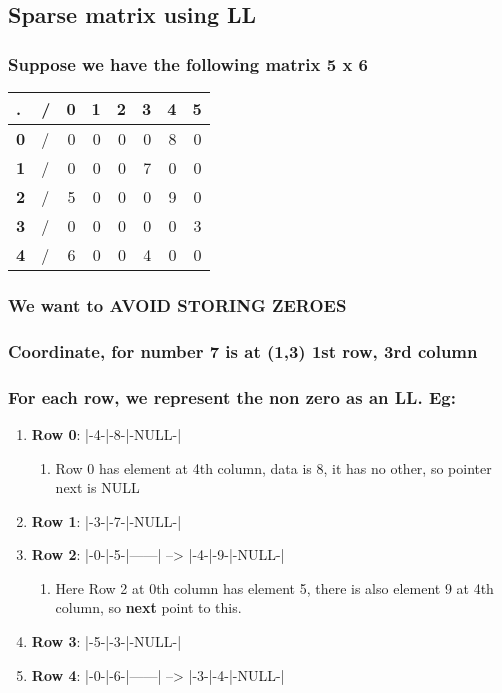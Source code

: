 \documentclass[11pt]{article}
\begin{document}
\subsection{Sparse matrix using LL}
\label{sec:org076b9bd}
\subsubsection{Suppose we have the following matrix 5 x 6}
\label{sec:org19e9da1}

\begin{center}
\begin{tabular}{llrrrrrr}
. & / & \textbf{0} & \textbf{1} & \textbf{2} & \textbf{3} & \textbf{4} & \textbf{5}\\
\hline
\textbf{0} & / & 0 & 0 & 0 & 0 & 8 & 0\\
\textbf{1} & / & 0 & 0 & 0 & 7 & 0 & 0\\
\textbf{2} & / & 5 & 0 & 0 & 0 & 9 & 0\\
\textbf{3} & / & 0 & 0 & 0 & 0 & 0 & 3\\
\textbf{4} & / & 6 & 0 & 0 & 4 & 0 & 0\\
\end{tabular}
\end{center}

\subsubsection{We want to \textbf{AVOID STORING ZEROES}}
\label{sec:org67a387f}
\subsubsection{Coordinate, for number 7 is at (1,3) 1st row, 3rd column}
\label{sec:org0894341}
\subsubsection{For each row, we represent the non zero as an LL. Eg:}
\label{sec:orgb5c42d9}
\begin{enumerate}
\item \textbf{Row 0}: |-4-|-8-|-NULL-|
\label{sec:org149fd4d}
\begin{enumerate}
\item Row 0 has element at 4th column, data is 8, it has no other, so pointer next is NULL
\label{sec:orgdbd4faf}
\end{enumerate}
\item \textbf{Row 1}: |-3-|-7-|-NULL-|
\label{sec:orge577ccc}
\item \textbf{Row 2}: |-0-|-5-|------| --> |-4-|-9-|-NULL-|
\label{sec:orgc56a758}
\begin{enumerate}
\item Here Row 2 at 0th column has element 5, there is also element 9 at 4th column, so \textbf{next} point to this.
\label{sec:org54205dc}
\end{enumerate}
\item \textbf{Row 3}: |-5-|-3-|-NULL-|
\label{sec:org2337b2e}
\item \textbf{Row 4}: |-0-|-6-|------| --> |-3-|-4-|-NULL-|
\label{sec:org16cf40b}
\end{enumerate}
\end{document}
